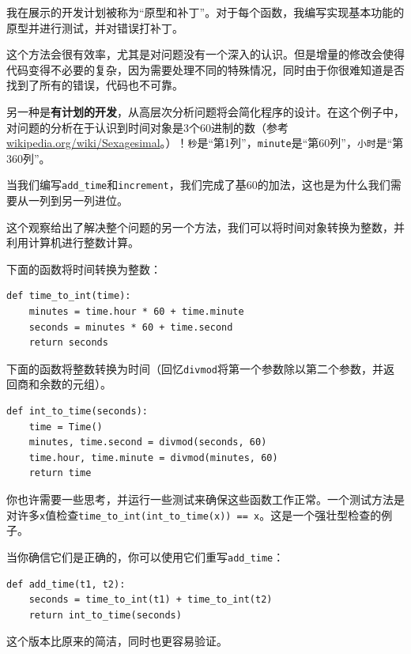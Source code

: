 我在展示的开发计划被称为“原型和补丁”。对于每个函数，我编写实现基本功能的原型并进行测试，并对错误打补丁。

这个方法会很有效率，尤其是对问题没有一个深入的认识。但是增量的修改会使得代码变得不必要的复杂，因为需要处理不同的特殊情况，同时由于你很难知道是否找到了所有的错误，代码也不可靠。

另一种是{\bf 有计划的开发}，从高层次分析问题将会简化程序的设计。在这个例子中，对问题的分析在于认识到时间对象是3个60进制的数（参考\url{wikipedia.org/wiki/Sexagesimal}。）！{\tt 秒}是“第1列”，{\tt minute}是“第60列”，{\tt 小时}是“第360列”。


当我们编写\verb"add_time"和{\tt increment}，我们完成了基60的加法，这也是为什么我们需要从一列到另一列进位。


这个观察给出了解决整个问题的另一个方法，我们可以将时间对象转换为整数，并利用计算机进行整数计算。

下面的函数将时间转换为整数：

\beforeverb
\begin{verbatim}
def time_to_int(time):
    minutes = time.hour * 60 + time.minute
    seconds = minutes * 60 + time.second
    return seconds
\end{verbatim}
\afterverb
%
下面的函数将整数转换为时间（回忆{\tt divmod}将第一个参数除以第二个参数，并返回商和余数的元组）。


\beforeverb
\begin{verbatim}
def int_to_time(seconds):
    time = Time()
    minutes, time.second = divmod(seconds, 60)
    time.hour, time.minute = divmod(minutes, 60)
    return time
\end{verbatim}
\afterverb
%
你也许需要一些思考，并运行一些测试来确保这些函数工作正常。一个测试方法是对许多{\tt x}值检查\verb"time_to_int(int_to_time(x)) == x"。这是一个强壮型检查的例子。


当你确信它们是正确的，你可以使用它们重写\verb"add_time"：

\beforeverb
\begin{verbatim}
def add_time(t1, t2):
    seconds = time_to_int(t1) + time_to_int(t2)
    return int_to_time(seconds)
\end{verbatim}
\afterverb
%
这个版本比原来的简洁，同时也更容易验证。

